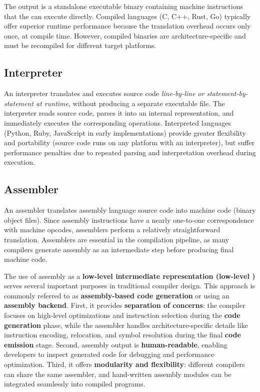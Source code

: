 The output is a standalone executable binary containing machine instructions that the  can execute directly. Compiled languages (C, C++, Rust, Go) typically offer superior runtime performance because the translation overhead occurs only once, at compile time. However, compiled binaries are architecture-specific and must be recompiled for different target platforms.

\subsection{Interpreter}
An interpreter translates and executes source code \textit{line-by-line or statement-by-statement at runtime}, without producing a separate executable file. The interpreter reads source code, parses it into an internal representation, and immediately executes the corresponding operations. Interpreted languages (Python, Ruby, JavaScript in early implementations) provide greater flexibility and portability (source code runs on any platform with an interpreter), but suffer performance penalties due to repeated parsing and interpretation overhead during execution.

\subsection{Assembler}
An assembler translates assembly language source code into machine code (binary object files). Since assembly instructions have a nearly one-to-one correspondence with machine opcodes, assemblers perform a relatively straightforward translation. Assemblers are essential in the compilation pipeline, as many compilers generate assembly as an intermediate step before producing final machine code.

The use of assembly as a \textbf{low-level intermediate representation (low-level )} serves several important purposes in traditional compiler design. This approach is commonly referred to as \textbf{assembly-based code generation} or using an \textbf{assembly backend}. First, it provides \textbf{separation of concerns}: the compiler focuses on high-level optimizations and instruction selection during the \textbf{code generation} phase, while the assembler handles architecture-specific details like instruction encoding, relocation, and symbol resolution during the final \textbf{code emission} stage. Second, assembly output is \textbf{human-readable}, enabling developers to inspect generated code for debugging and performance optimization. Third, it offers \textbf{modularity and flexibility}: different compilers can share the same assembler, and hand-written assembly modules can be integrated seamlessly into compiled programs.

